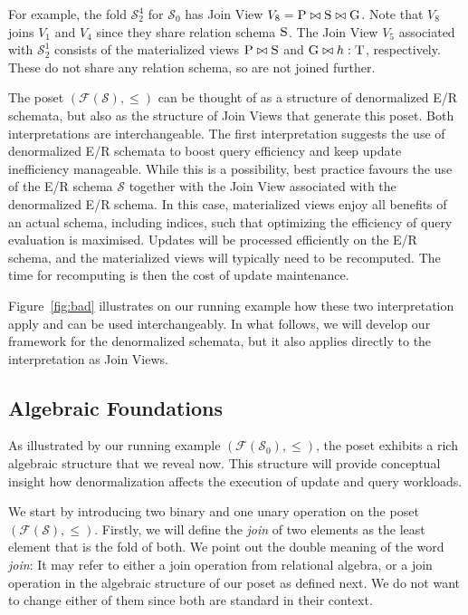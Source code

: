 \documentclass[sigconf]{acmart}
\begin{document}
For example, the fold $\mathcal{S}^4_2$ for $\mathcal{S}_0$ has Join View $V_8=\textsc{P}\bowtie \textsc{S}\bowtie\textsc{G}$. Note that $V_8$ joins $V_1$ and $V_4$ since they share relation schema $\textsc{S}$. The Join View $V_5$ associated with $\mathcal{S}^1_2$ consists of the materialized views $\textsc{P}\bowtie\textsc{S}$ and $\textsc{G}\bowtie h:\textsc{T}$, respectively. These do not share any relation schema, so are not joined further.

The poset $(\mathcal{F}(\mathcal{S}),\le)$ can be thought of as a structure of denormalized E/R schemata, but also as the structure of Join Views that generate this poset. Both interpretations are interchangeable. The first interpretation suggests the use of denormalized E/R schemata to boost query efficiency and keep update inefficiency manageable. While this is a possibility, best practice favours the use of the E/R schema $\mathcal{S}$ together with the Join View associated with the denormalized E/R schema. In this case, materialized views enjoy all benefits of an actual schema, including indices, such that optimizing the efficiency of query evaluation is maximised. Updates will be processed efficiently on the E/R schema, and the materialized views will typically need to be recomputed. The time for recomputing is then the cost of update maintenance.

Figure~\ref{fig:bad} illustrates on our running example how these two interpretation apply and can be used interchangeably. In what follows, we will develop our framework for the denormalized schemata, but it also applies directly to the interpretation as Join Views.

\subsection{Algebraic Foundations}

As illustrated by our running example $(\mathcal{F}(\mathcal{S}_0),\le)$, the poset exhibits a rich algebraic structure that we reveal now. This structure will provide conceptual insight how denormalization affects the execution of update and query workloads.

We start by introducing two binary and one unary operation on the poset $(\mathcal{F}(\mathcal{S}),\le)$. Firstly, we will define the \emph{join} of two elements as the least element that is the fold of both. We point out the double meaning of the word \textit{join}: It may refer to either a join operation from relational algebra, or a join operation in the algebraic structure of our poset as defined next. We do not want to change either of them since both are standard in their context.
\end{document}
